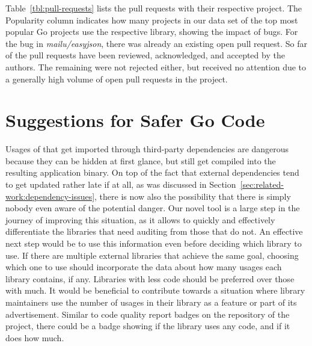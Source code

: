 

Table~\ref{tbl:pull-requests} lists the pull requests with their respective \github{} project.
The Popularity column indicates how many projects in our data set of the top \projsTotal{} most popular Go projects use
the respective library, showing the impact of bugs.
For the bug in \textit{mailu/easyjson}, there was already an existing open pull request.
So far \numberPRsMerged{} of the pull requests have been reviewed, acknowledged, and accepted by the authors.
The remaining were not rejected either, but received no attention due to a generally high volume of open pull requests
in the project.



\section{Suggestions for Safer Go Code}\label{sec:discussion:safer-go-code}

Usages of \unsafe{} that get imported through third-party dependencies are dangerous because they can be hidden at first
glance, but still get compiled into the resulting application binary.
On top of the fact that external dependencies tend to get updated rather late if at all, as was discussed in
Section~\ref{sec:related-work:dependency-issues}, there is now also the possibility that there is simply nobody even
aware of the potential danger.
Our novel tool \toolGeiger{} is a large step in the journey of improving this situation, as it allows to quickly and
effectively differentiate the libraries that need auditing from those that do not.
An effective next step would be to use this information even before deciding which library to use.
If there are multiple external libraries that achieve the same goal, choosing which one to use should incorporate the
data about how many \unsafe{} usages each library contains, if any.
Libraries with less \unsafe{} code should be preferred over those with much.
It would be beneficial to contribute towards a situation where library maintainers use the number of \unsafe{} usages
in their library as a feature or part of its advertisement.
Similar to code quality report badges on the \github{} repository of the project, there could be a badge showing if the
library uses any \unsafe{} code, and if it does how much.

